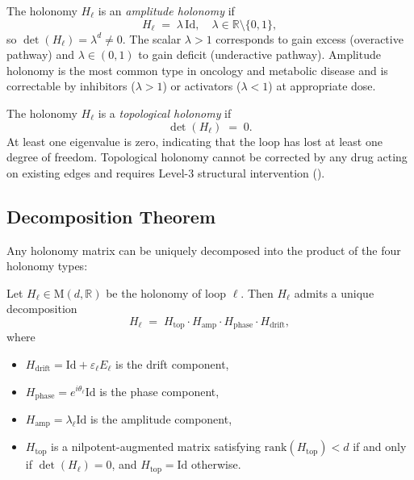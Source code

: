 \begin{definition}
\label{def:ch10-amplitude-holonomy}
The holonomy $H_\ell$ is an \emph{amplitude holonomy} if
\begin{equation}
  H_\ell \;=\; \lambda\, \mathrm{Id},
  \quad \lambda \in \mathbb{R} \setminus \{0, 1\},
\end{equation}
so $\det(H_\ell) = \lambda^d \neq 0$.  The scalar $\lambda > 1$ corresponds to
gain excess (overactive pathway) and $\lambda \in (0,1)$ to gain deficit
(underactive pathway).  Amplitude holonomy is the most common type in oncology
and metabolic disease and is correctable by inhibitors ($\lambda > 1$) or
activators ($\lambda < 1$) at appropriate dose.
\end{definition}

\begin{definition}
\label{def:ch10-topological-holonomy}
The holonomy $H_\ell$ is a \emph{topological holonomy} if
\begin{equation}
  \det(H_\ell) \;=\; 0.
\end{equation}
At least one eigenvalue is zero, indicating that the loop has lost at least one
degree of freedom.  Topological holonomy cannot be corrected by any drug acting
on existing edges and requires Level-3 structural intervention
().
\end{definition}

\subsection{Decomposition Theorem}

Any holonomy matrix can be uniquely decomposed into the product of the four
holonomy types:

\begin{theorem}
\label{thm:ch10-decomposition}
Let $H_\ell \in \mathrm{M}(d, \mathbb{R})$ be the holonomy of loop $\ell$.
Then $H_\ell$ admits a unique decomposition
\begin{equation}
  \label{eq:ch10-decomposition}
  H_\ell \;=\; H_{\mathrm{top}} \cdot H_{\mathrm{amp}} \cdot H_{\mathrm{phase}} \cdot H_{\mathrm{drift}},
\end{equation}
where
\begin{itemize}
  \item $H_{\mathrm{drift}} = \mathrm{Id} + \varepsilon_\ell E_\ell$ is the drift component,
  \item $H_{\mathrm{phase}} = e^{i\theta_\ell} \mathrm{Id}$ is the phase component,
  \item $H_{\mathrm{amp}} = \lambda_\ell \mathrm{Id}$ is the amplitude component,
  \item $H_{\mathrm{top}}$ is a nilpotent-augmented matrix satisfying
        $\mathrm{rank}(H_{\mathrm{top}}) < d$ if and only if $\det(H_\ell) = 0$,
        and $H_{\mathrm{top}} = \mathrm{Id}$ otherwise.
\end{itemize}
\end{theorem}

